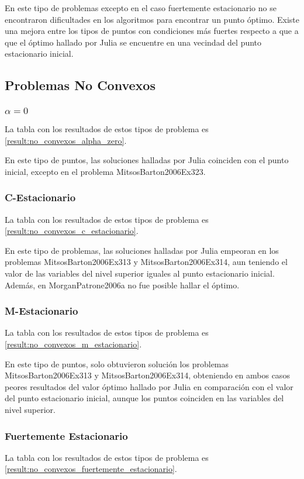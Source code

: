 En este tipo de problemas excepto en el caso fuertemente estacionario no se encontraron dificultades en los algoritmos para encontrar un punto óptimo. Existe una mejora entre los tipos de puntos con condiciones más fuertes respecto a que a que el óptimo hallado por Julia se encuentre en una vecindad del punto estacionario inicial. 

\subsection{Problemas No Convexos}


\subsubsection{$\alpha =0$}
La tabla con los resultados de estos tipos de problema es \ref{result:no_convexos_alpha_zero}.

 En este tipo de puntos, las soluciones halladas por Julia coinciden con el punto inicial, excepto en el problema MitsosBarton2006Ex323.
    
\subsubsection{C-Estacionario}
La tabla con los resultados de estos tipos de problema es \ref{result:no_convexos_c_estacionario}.

 En este tipo de problemas, las soluciones halladas por Julia empeoran en los problemas MitsosBarton2006Ex313 y MitsosBarton2006Ex314, aun teniendo el valor de las variables del nivel superior iguales al punto estacionario inicial. Además, en MorganPatrone2006a no fue posible hallar el óptimo.
\subsubsection{M-Estacionario}
La tabla con los resultados de estos tipos de problema es \ref{result:no_convexos_m_estacionario}.  

 En este tipo de puntos, solo obtuvieron solución los problemas MitsosBarton2006Ex313 y MitsosBarton2006Ex314, obteniendo en ambos casos peores resultados del valor óptimo hallado por Julia en comparación con el valor del punto estacionario inicial, aunque los puntos coinciden en las variables del nivel superior.
    
\subsubsection{Fuertemente Estacionario}
La tabla con los resultados de estos tipos de problema es \ref{result:no_convexos_fuertemente_estacionario}.

